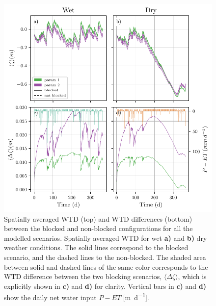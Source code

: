 \documentclass[bg, manuscript]{copernicus}
\begin{document}
\begin{figure}[t]
\centering
\includegraphics[width=12 cm]{figs/combined_every_param_diff_vs_time_wet_and_dry.pdf}
\caption{Spatially averaged WTD (top) and WTD differences (bottom) between the blocked and non-blocked configurations for all the modelled scenarios. Spatially averaged WTD for wet \textbf{a)} and \textbf{b)} dry weather conditions. The solid lines correspond to the blocked scenario, and the dashed lines to the non-blocked. The shaded area between solid and dashed lines of the same color corresponds to the WTD difference between the two blocking scenarios, $\langle\Delta\zeta\rangle$, which is explicitly shown in \textbf{c)} and \textbf{d)} for clarity. Vertical bars in \textbf{c)} and \textbf{d)} show the daily net water input $P - ET$ [\unit{m d^{-1}}].}
\label{fig:combined_wtd_and_diff_weathers_and_params}
\end{figure}   


\end{document}
